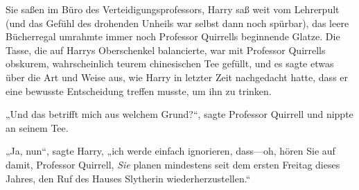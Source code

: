 Sie saßen im Büro des Verteidigungsprofessors, Harry saß weit vom Lehrerpult (und das Gefühl des drohenden Unheils war selbst dann noch spürbar), das leere Bücherregal umrahmte immer noch Professor Quirrells beginnende Glatze. Die Tasse, die auf Harrys Oberschenkel balancierte, war mit Professor Quirrells obskurem, wahrscheinlich teurem chinesischen Tee gefüllt, und es sagte etwas über die Art und Weise aus, wie Harry in letzter Zeit nachgedacht hatte, dass er eine bewusste Entscheidung treffen musste, um ihn zu trinken.

„Und das betrifft mich aus welchem Grund?“, sagte Professor Quirrell und nippte an seinem Tee.

„Ja, nun“, sagte Harry, „ich werde einfach ignorieren, dass—oh, hören Sie auf damit, Professor Quirrell, \emph{Sie} planen mindestens seit dem ersten Freitag dieses Jahres, den Ruf des Hauses Slytherin wiederherzustellen.“

